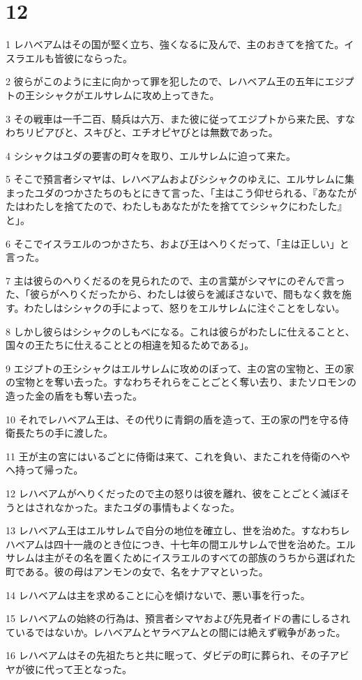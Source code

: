 \chapter{12}

\par 1 レハベアムはその国が堅く立ち、強くなるに及んで、主のおきてを捨てた。イスラエルも皆彼にならった。
\par 2 彼らがこのように主に向かって罪を犯したので、レハベアム王の五年にエジプトの王シシャクがエルサレムに攻め上ってきた。
\par 3 その戦車は一千二百、騎兵は六万、また彼に従ってエジプトから来た民、すなわちリビアびと、スキびと、エチオピヤびとは無数であった。
\par 4 シシャクはユダの要害の町々を取り、エルサレムに迫って来た。
\par 5 そこで預言者シマヤは、レハベアムおよびシシャクのゆえに、エルサレムに集まったユダのつかさたちのもとにきて言った、「主はこう仰せられる、『あなたがたはわたしを捨てたので、わたしもあなたがたを捨ててシシャクにわたした』と」。
\par 6 そこでイスラエルのつかさたち、および王はへりくだって、「主は正しい」と言った。
\par 7 主は彼らのへりくだるのを見られたので、主の言葉がシマヤにのぞんで言った、「彼らがへりくだったから、わたしは彼らを滅ぼさないで、間もなく救を施す。わたしはシシャクの手によって、怒りをエルサレムに注ぐことをしない。
\par 8 しかし彼らはシシャクのしもべになる。これは彼らがわたしに仕えることと、国々の王たちに仕えることとの相違を知るためである」。
\par 9 エジプトの王シシャクはエルサレムに攻めのぼって、主の宮の宝物と、王の家の宝物とを奪い去った。すなわちそれらをことごとく奪い去り、またソロモンの造った金の盾をも奪い去った。
\par 10 それでレハベアム王は、その代りに青銅の盾を造って、王の家の門を守る侍衛長たちの手に渡した。
\par 11 王が主の宮にはいるごとに侍衛は来て、これを負い、またこれを侍衛のへやへ持って帰った。
\par 12 レハベアムがへりくだったので主の怒りは彼を離れ、彼をことごとく滅ぼそうとはされなかった。またユダの事情もよくなった。
\par 13 レハベアム王はエルサレムで自分の地位を確立し、世を治めた。すなわちレハベアムは四十一歳のとき位につき、十七年の間エルサレムで世を治めた。エルサレムは主がその名を置くためにイスラエルのすべての部族のうちから選ばれた町である。彼の母はアンモンの女で、名をナアマといった。
\par 14 レハベアムは主を求めることに心を傾けないで、悪い事を行った。
\par 15 レハベアムの始終の行為は、預言者シマヤおよび先見者イドの書にしるされているではないか。レハベアムとヤラベアムとの間には絶えず戦争があった。
\par 16 レハベアムはその先祖たちと共に眠って、ダビデの町に葬られ、その子アビヤが彼に代って王となった。

